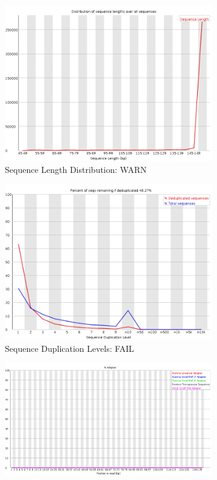 \documentclass{article}
\begin{document}
\begin{figure}[htbp]
\begin{subfigure}{0.45\linewidth}
\includegraphics[width=\linewidth]{04-R1.qfilter_fastqc/Images/sequence_length_distribution.png}
\caption{Sequence Length Distribution: WARN}
\end{subfigure}
\begin{subfigure}{0.45\linewidth}
\includegraphics[width=\linewidth]{04-R1.qfilter_fastqc/Images/duplication_levels.png}
\caption{Sequence Duplication Levels: FAIL}
\end{subfigure}
\begin{subfigure}{0.45\linewidth}
\includegraphics[width=\linewidth]{04-R1.qfilter_fastqc/Images/adapter_content.png}

\end{subfigure}
\end{figure}
\end{document}

